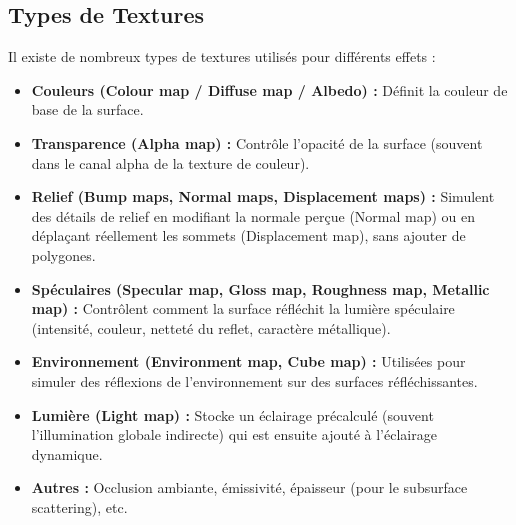 \documentclass{article}
\begin{document}
\subsection{Types de Textures}
Il existe de nombreux types de textures utilisés pour différents effets :
\begin{itemize}
    \item \textbf{Couleurs (Colour map / Diffuse map / Albedo) :} Définit la couleur de base de la surface.
    \item \textbf{Transparence (Alpha map) :} Contrôle l'opacité de la surface (souvent dans le canal alpha de la texture de couleur).
    \item \textbf{Relief (Bump maps, Normal maps, Displacement maps) :} Simulent des détails de relief en modifiant la normale perçue (Normal map) ou en déplaçant réellement les sommets (Displacement map), sans ajouter de polygones.
    \item \textbf{Spéculaires (Specular map, Gloss map, Roughness map, Metallic map) :} Contrôlent comment la surface réfléchit la lumière spéculaire (intensité, couleur, netteté du reflet, caractère métallique).
    \item \textbf{Environnement (Environment map, Cube map) :} Utilisées pour simuler des réflexions de l'environnement sur des surfaces réfléchissantes.
    \item \textbf{Lumière (Light map) :} Stocke un éclairage précalculé (souvent l'illumination globale indirecte) qui est ensuite ajouté à l'éclairage dynamique.
    \item \textbf{Autres :} Occlusion ambiante, émissivité, épaisseur (pour le subsurface scattering), etc.
\end{itemize}
\end{document}
